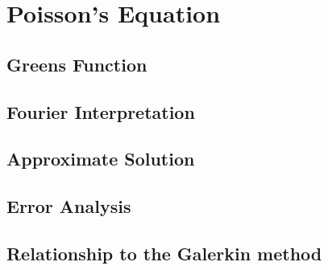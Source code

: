 \section{Poisson's Equation} 

\subsection{Greens Function}

\subsection{Fourier Interpretation}


\subsection{Approximate Solution}


\subsection{Error Analysis}


\subsection{Relationship to the Galerkin method}

